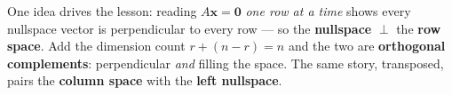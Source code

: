 \documentclass[10pt]{article}
\begin{document}
\vspace{0.10in}

\begin{remindbox}
\small One idea drives the lesson: reading $A\mathbf{x}=\mathbf{0}$ \emph{one row at a time} shows every
nullspace vector is perpendicular to every row --- so the \textbf{nullspace} $\perp$ the \textbf{row
space}. Add the dimension count $r+(n-r)=n$ and the two are \textbf{orthogonal complements}: perpendicular
\emph{and} filling the space. The same story, transposed, pairs the \textbf{column space} with the
\textbf{left nullspace}.
\end{remindbox}
\end{document}
